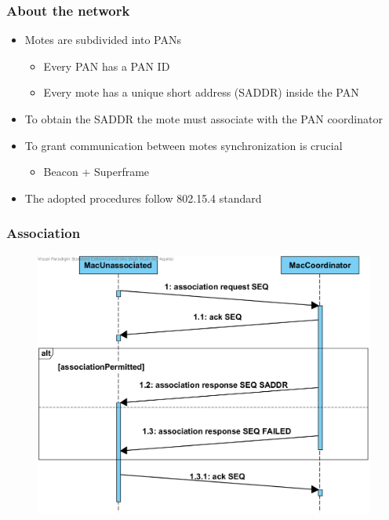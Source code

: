 \begin{frame}[fragile]
  \frametitle{About the network}
  \begin{itemize}
    \item Motes are subdivided into PANs
    \begin{itemize}
    	\item Every PAN has a PAN ID
    	\item Every mote has a unique short address (SADDR) inside the PAN
    \end{itemize}
    \item To obtain the SADDR the mote must associate with the PAN coordinator
    \item To grant communication between motes synchronization is crucial
    \begin{itemize}
      \item Beacon + Superframe
    \end{itemize}
    \item The adopted procedures follow 802.15.4 standard
  \end{itemize}
\end{frame}

\begin{frame}[fragile]
  \frametitle{Association}
  \begin{figure}
    \centering
    \includegraphics[width=.8\textwidth]{img/Association.png}
  \end{figure}
\end{frame}

